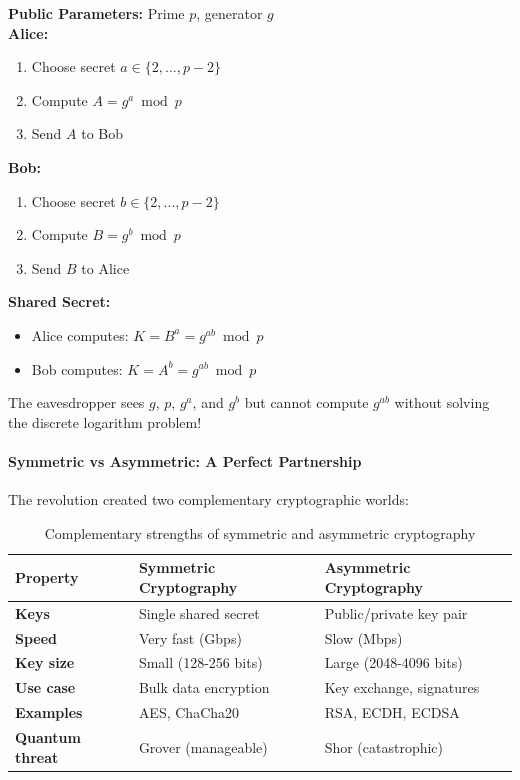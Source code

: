 \documentclass[11pt,a4paper]{article}
\begin{document}
\begin{algorithm}
\caption{Diffie-Hellman Key Exchange}
\textbf{Public Parameters:} Prime $p$, generator $g$\\
\textbf{Alice:}
\begin{enumerate}
    \item Choose secret $a \in \{2, ..., p-2\}$
    \item Compute $A = g^a \bmod p$
    \item Send $A$ to Bob
\end{enumerate}
\textbf{Bob:}
\begin{enumerate}
    \item Choose secret $b \in \{2, ..., p-2\}$
    \item Compute $B = g^b \bmod p$
    \item Send $B$ to Alice
\end{enumerate}
\textbf{Shared Secret:}
\begin{itemize}
    \item Alice computes: $K = B^a = g^{ab} \bmod p$
    \item Bob computes: $K = A^b = g^{ab} \bmod p$
\end{itemize}
\end{algorithm}

The eavesdropper sees $g$, $p$, $g^a$, and $g^b$ but cannot compute $g^{ab}$ without solving the discrete logarithm problem!

\paragraph{Symmetric vs Asymmetric: A Perfect Partnership}

The revolution created two complementary cryptographic worlds:

\begin{table}[h]
\centering
\begin{tabularx}{\textwidth}{|l|X|X|}
\hline
\textbf{Property} & \textbf{Symmetric Cryptography} & \textbf{Asymmetric Cryptography} \\
\hline
\textbf{Keys} & Single shared secret & Public/private key pair \\
\textbf{Speed} & Very fast (Gbps) & Slow (Mbps) \\
\textbf{Key size} & Small (128-256 bits) & Large (2048-4096 bits) \\
\textbf{Use case} & Bulk data encryption & Key exchange, signatures \\
\textbf{Examples} & AES, ChaCha20 & RSA, ECDH, ECDSA \\
\textbf{Quantum threat} & Grover (manageable) & Shor (catastrophic) \\
\hline
\end{tabularx}
\caption{Complementary strengths of symmetric and asymmetric cryptography}
\end{table}
\end{document}
